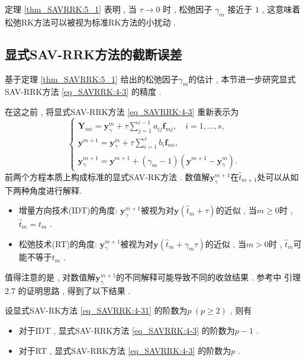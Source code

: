 \begin{remark}\label{rk_SAVRRK:5_1}
定理 \ref{thm_SAVRRK:5_1} 表明 , 当 $\tau\rightarrow 0$ 时 , 松弛因子 $\gamma_m$ 接近于 $1$ , 
这意味着松弛RK方法可以被视为标准RK方法的小扰动 . 
\end{remark}

\subsection{显式SAV-RRK方法的截断误差}
基于定理 \ref{thm_SAVRRK:5_1} 给出的松弛因子$\gamma_m$的估计 , 本节进一步研究显式SAV-RRK方法 \eqref{eq_SAVRRK:4-3} 的精度 . 

在这之前 , 将显式SAV-RRK方法 \eqref{eq_SAVRRK:4-3} 重新表示为
\begin{equation}
\left\{\begin{array}{l}
\bm{Y}_{m i}=\bm{y}_\gamma^m+\tau \sum\limits_{j=1}^{i-1} a_{i j} \bm{f}_{m j} , \quad i=1 , \ldots , s , \\
\bm{y}^{m+1}=\bm{y}_\gamma^m+\tau \sum\limits_{i=1}^s b_i \bm{f}_{m i} , \\
\bm{y}_\gamma^{m+1}=\bm{y}^{m+1}+\left(\gamma_m-1\right)\left(\bm{y}^{m+1}-\bm{y}_\gamma^m\right)  . 
\end{array}\right . \label{eq_SAVRRK:4-321}
\end{equation}
前两个方程本质上构成标准的显式SAV-RK方法 . 
\newpage
数值解$\bm{y}_\gamma^{m+1}$在$\hat{t}_{m+1}$处可以从如下两种角度进行解释\cite{ketchesonRelaxationRungeKutta2019}.%
\begin{itemize}
\item 增量方向技术(IDT)的角度: $\bm{y}_\gamma^{m+1}$被视为对$\bm{y}\left(\hat{t}_m+\tau\right)$的近似 , 当$m \geq 0$时 , $\hat{t}_m=t_m$ . 
\item 松弛技术(RT)的角度: $\bm{y}_\gamma^{m+1}$被视为对$\bm{y}\left(\hat{t}_m+\gamma_m \tau\right)$的近似 , 当$m>0$时 , $\hat{t}_m$可能不等于$t_m$ . 
\end{itemize}

值得注意的是 , 对数值解$\bm{y}_\gamma^{m+1}$的不同解释可能导致不同的收敛结果 . 
参考\citep{ranochaGeneralRelaxationMethods2020}中 引理 2.7 的证明思路 , 得到了以下结果 . 

\begin{theorem}\label{thm_SAVRRK:5_4}
设显式SAV-RK方法 \eqref{eq_SAVRRK:4-31} 的阶数为$p~(p \geq 2)$ , 则有
\begin{itemize}
\item 对于IDT , 显式SAV-RRK方法 \eqref{eq_SAVRRK:4-3} 的阶数为$p-1$ . 
\item 对于RT , 显式SAV-RRK方法 \eqref{eq_SAVRRK:4-3} 的阶数为$p$ . 
\end{itemize}
\end{theorem}


